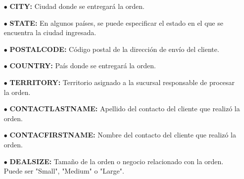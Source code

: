 \documentclass[a4paper]{article}
\begin{document}
\begin{itemize}
    \item [$\bullet$] \textbf{CITY:} Ciudad donde se entregará la orden.
    \item [$\bullet$] \textbf{STATE:} En algunos países, se puede especificar el estado en el que se encuentra la ciudad ingresada.
    \item [$\bullet$] \textbf{POSTALCODE:} Código postal de la dirección de envío del cliente.
    \item [$\bullet$] \textbf{COUNTRY:} País donde se entregará la orden.
    \item [$\bullet$] \textbf{TERRITORY:} Territorio asignado a la sucursal responsable de procesar la orden.
    \item [$\bullet$] \textbf{CONTACTLASTNAME:} Apellido del contacto del cliente que realizó la orden.
    \item [$\bullet$] \textbf{CONTACFIRSTNAME:} Nombre del contacto del cliente que realizó la orden.
    \item [$\bullet$] \textbf{DEALSIZE:} Tamaño de la orden o negocio relacionado con la orden. Puede ser "Small", "Medium" o "Large".
  \end{itemize}
\end{document}
